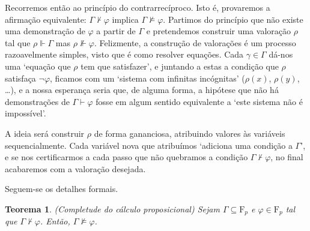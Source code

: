 \documentclass{report}
\newtheorem{teorema}{Teorema}
\theoremstyle{definition}
\theoremstyle{remark}
\newcommand{\F}{\mathrm{F}}
\begin{document}
	Recorremos então ao princípio do contrarrecíproco. Isto é, provaremos a afirmação equivalente: $\Gamma \nvdash \varphi$ implica $\Gamma \nvDash \varphi$. Partimos do princípio que não existe uma demonstração de $\varphi$ a partir de $\Gamma$ e pretendemos construir uma valoração $\rho$ tal que $\rho \Vdash \Gamma$ mas $\rho \nVdash \varphi$. Felizmente, a construção de valorações é um processo razoavelmente simples, visto que é como resolver equações. Cada $\gamma \in \Gamma$ dá-nos uma `equação que $\rho$ tem que satisfazer', e juntando a estas a condição que $\rho$ satisfaça $\neg \varphi$, ficamos com um `sistema com infinitas incógnitas' ($\rho(x)$, $\rho(y)$, \dots), e a nossa esperança seria que, de alguma forma, a hipótese que não há demonstrações de $\Gamma \vdash \varphi$ fosse em algum sentido equivalente a `este sistema não é impossível'.
	
	A ideia será construir $\rho$ de forma gananciosa, atribuindo valores às variáveis sequencialmente. Cada variável nova que atribuímos `adiciona uma condição a $\Gamma$', e se nos certificarmos a cada passo que não quebramos a condição $\Gamma \nvdash \varphi$, no final acabaremos com a valoração desejada.
	
	Seguem-se os detalhes formais.
	
	\begin{teorema} (Completude do cálculo proposicional)
	Sejam $\Gamma \subseteq \F_p$ e $\varphi \in \F_p$ tal que $\Gamma \nvdash \varphi$. Então, $\Gamma \nvDash \varphi$.
	\end{teorema}
	
\end{document}

